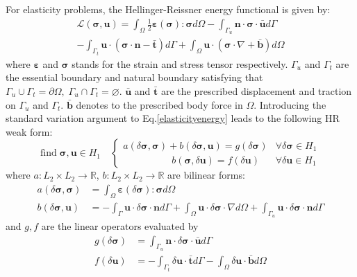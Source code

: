 \documentclass{article}
\begin{document}
For elasticity problems, the Hellinger-Reissner energy functional is given by:
\begin{multline}\label{elasticityenergy}
    \mathcal L(\boldsymbol \sigma, \boldsymbol u) = \int_{\Omega} \frac{1}{2} \boldsymbol \varepsilon(\boldsymbol \sigma) : \boldsymbol \sigma d\Omega - \int_{\Gamma_u} \boldsymbol n \cdot \boldsymbol \sigma \cdot \bar{\boldsymbol u} d\Gamma \\
    - \int_{\Gamma_t} \boldsymbol u \cdot (\boldsymbol \sigma \cdot \boldsymbol n - \bar{\boldsymbol t}) d\Gamma + \int_{\Omega} \boldsymbol u \cdot (\boldsymbol \sigma \cdot \nabla + \bar{\boldsymbol b}) d\Omega
\end{multline}
where $\boldsymbol \varepsilon$ and $\boldsymbol \sigma$ stands for the strain and stress tensor respectively. $\Gamma_u$ and $\Gamma_t$ are the essential boundary and natural boundary satisfying that $\Gamma_u \cup \Gamma_t = \partial \Omega,\; \Gamma_u \cap \Gamma_t = \varnothing$. $\bar{\boldsymbol u}$ and $\bar{\boldsymbol t}$ are the prescribed displacement and traction on $\Gamma_u$ and $\Gamma_t$. $\bar{\boldsymbol b}$ denotes to the prescribed body force in $\Omega$. Introducing the standard variation argument to Eq.\ref{elasticityenergy} leads to the following HR weak form:
\begin{equation}
    \mathrm{find} \; \boldsymbol \sigma, \boldsymbol u \in H_1 \quad
    \begin{cases}
        a(\delta \boldsymbol \sigma,\boldsymbol \sigma) + b(\delta \boldsymbol \sigma, \boldsymbol u) = g(\delta \boldsymbol \sigma) & \forall \delta \boldsymbol \sigma \in H_1 \\
        \qquad \qquad \quad b(\boldsymbol \sigma, \delta \boldsymbol u) = f(\delta \boldsymbol u) & \forall \delta \boldsymbol u \in H_1
    \end{cases}
\end{equation}
where $a:L_2\times L_2\rightarrow \mathbb R$, $b:L_2\times L_2 \rightarrow \mathbb R$ are bilinear forms: 
\begin{align}
    a(\delta \boldsymbol \sigma,\boldsymbol \sigma) &= \int_{\Omega} \boldsymbol \varepsilon(\delta \boldsymbol \sigma):\boldsymbol \sigma d\Omega \\
    b(\delta \boldsymbol \sigma,\boldsymbol u) &= - \int_{\Gamma} \boldsymbol u \cdot \delta \boldsymbol \sigma \cdot \boldsymbol n d\Gamma + \int_{\Omega} \boldsymbol u \cdot \delta \boldsymbol \sigma \cdot \nabla d\Omega + \int_{\Gamma_u} \boldsymbol u \cdot \delta \boldsymbol \sigma \cdot \boldsymbol n d\Gamma
\end{align}
and $g,f$ are the linear operators evaluated by
\begin{align}
    g(\delta \boldsymbol \sigma) &= \int_{\Gamma_u} \boldsymbol n \cdot \delta \boldsymbol \sigma \cdot \bar{\boldsymbol u} d\Gamma \\
    f(\delta \boldsymbol u) &= - \int_{\Gamma_t} \delta \boldsymbol u \cdot \bar{\boldsymbol t} d\Gamma - \int_{\Omega} \delta \boldsymbol u \cdot \bar{\boldsymbol b} d\Omega
\end{align}
\end{document}
